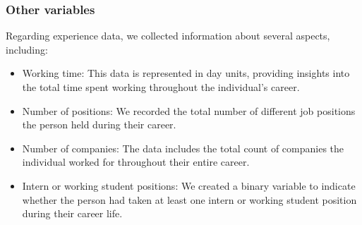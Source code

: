 \documentclass[11pt,]{article}
\begin{document}
\hypertarget{other-variables}{%
\subsubsection{Other variables}\label{other-variables}}

Regarding experience data, we collected information about several
aspects, including:

\begin{itemize}
\item
  Working time: This data is represented in day units, providing
  insights into the total time spent working throughout the individual's
  career.
\item
  Number of positions: We recorded the total number of different job
  positions the person held during their career.
\item
  Number of companies: The data includes the total count of companies
  the individual worked for throughout their entire career.
\item
  Intern or working student positions: We created a binary variable to
  indicate whether the person had taken at least one intern or working
  student position during their career life.
\end{itemize}
\end{document}
